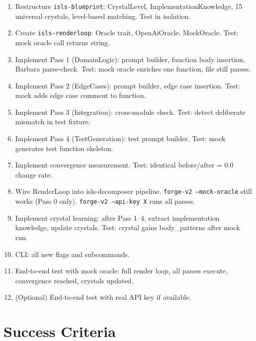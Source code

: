 \documentclass[11pt,a4paper]{article}
\begin{document}
\begin{enumerate}
\item Restructure \texttt{isls-blueprint}: CrystalLevel,
  ImplementationKnowledge, 15 universal crystals, level-based
  matching. Test in isolation.

\item Create \texttt{isls-renderloop}: Oracle trait, OpenAiOracle,
  MockOracle. Test: mock oracle call returns string.

\item Implement Pass 1 (DomainLogic): prompt builder, function
  body insertion, Barbara parse-check. Test: mock oracle enriches
  one function, file still parses.

\item Implement Pass 2 (EdgeCases): prompt builder, edge case
  insertion. Test: mock adds edge case comment to function.

\item Implement Pass 3 (Integration): cross-module check.
  Test: detect deliberate mismatch in test fixture.

\item Implement Pass 4 (TestGeneration): test prompt builder.
  Test: mock generates test function skeleton.

\item Implement convergence measurement. Test: identical
  before/after = 0.0 change rate.

\item Wire RenderLoop into isls-decomposer pipeline.
  \texttt{forge-v2 --mock-oracle} still works (Pass 0 only).
  \texttt{forge-v2 --api-key X} runs all passes.

\item Implement crystal learning: after Pass 1--4, extract
  implementation knowledge, update crystals. Test: crystal
  gains body\_patterns after mock run.

\item CLI: all new flags and subcommands.

\item End-to-end test with mock oracle: full render loop,
  all passes execute, convergence reached, crystals updated.

\item (Optional) End-to-end test with real API key if available.
\end{enumerate}

\section{Success Criteria}
\end{document}
